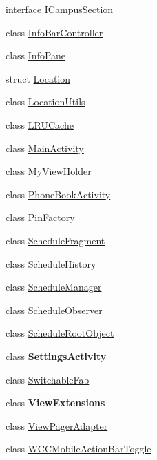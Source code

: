 \begin{DoxyCompactItemize}
interface \hyperlink{interface_w_c_c_mobile_1_1_i_campus_section}{I\+Campus\+Section}
\item 
class \hyperlink{class_w_c_c_mobile_1_1_info_bar_controller}{Info\+Bar\+Controller}
\item 
class \hyperlink{class_w_c_c_mobile_1_1_info_pane}{Info\+Pane}
\item 
struct \hyperlink{struct_w_c_c_mobile_1_1_location}{Location}
\item 
class \hyperlink{class_w_c_c_mobile_1_1_location_utils}{Location\+Utils}
\item 
class \hyperlink{class_w_c_c_mobile_1_1_l_r_u_cache}{L\+R\+U\+Cache}
\item 
class \hyperlink{class_w_c_c_mobile_1_1_main_activity}{Main\+Activity}
\item 
class \hyperlink{class_w_c_c_mobile_1_1_my_view_holder}{My\+View\+Holder}
\item 
class \hyperlink{class_w_c_c_mobile_1_1_phone_book_activity}{Phone\+Book\+Activity}
\item 
class \hyperlink{class_w_c_c_mobile_1_1_pin_factory}{Pin\+Factory}
\item 
class \hyperlink{class_w_c_c_mobile_1_1_schedule_fragment}{Schedule\+Fragment}
\item 
class \hyperlink{class_w_c_c_mobile_1_1_schedule_history}{Schedule\+History}
\item 
class \hyperlink{class_w_c_c_mobile_1_1_schedule_manager}{Schedule\+Manager}
\item 
class \hyperlink{class_w_c_c_mobile_1_1_schedule_observer}{Schedule\+Observer}
\item 
class \hyperlink{class_w_c_c_mobile_1_1_schedule_root_object}{Schedule\+Root\+Object}
\item 
class {\bfseries Settings\+Activity}
\item 
class \hyperlink{class_w_c_c_mobile_1_1_switchable_fab}{Switchable\+Fab}
\item 
class {\bfseries View\+Extensions}
\item 
class \hyperlink{class_w_c_c_mobile_1_1_view_pager_adapter}{View\+Pager\+Adapter}
\item 
class \hyperlink{class_w_c_c_mobile_1_1_w_c_c_mobile_action_bar_toggle}{W\+C\+C\+Mobile\+Action\+Bar\+Toggle}
\end{DoxyCompactItemize}
